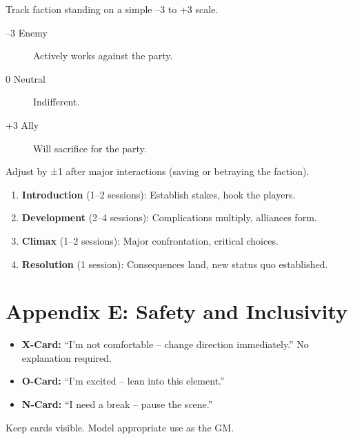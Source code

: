 \begin{tcolorbox}[title=Faction Loyalty Scale (Optional), colback=white!97!gray, colframe=black!80!gray,breakable]
Track faction standing on a simple --3 to +3 scale.
\begin{description}
  \item[--3 Enemy] Actively works against the party.
  \item[0 Neutral] Indifferent.
  \item[+3 Ally] Will sacrifice for the party.
\end{description}
Adjust by ±1 after major interactions (saving or betraying the faction).
\end{tcolorbox}

\begin{tcolorbox}[title=Campaign Pacing (Arc Structure), colback=white!97!gray, colframe=black!80!gray,breakable]
\begin{enumerate}
  \item \textbf{Introduction} (1--2 sessions): Establish stakes, hook the players.
  \item \textbf{Development} (2--4 sessions): Complications multiply, alliances form.
  \item \textbf{Climax} (1--2 sessions): Major confrontation, critical choices.
  \item \textbf{Resolution} (1 session): Consequences land, new status quo established.
\end{enumerate}
\end{tcolorbox}

\clearpage
\section*{Appendix E: Safety and Inclusivity}
\label{app:safety}

\begin{tcolorbox}[title=X-Card System, colback=white!97!gray, colframe=black!80!gray,breakable]
\begin{itemize}
  \item \textbf{X-Card:} ``I'm not comfortable -- change direction immediately.'' No explanation required.
  \item \textbf{O-Card:} ``I'm excited -- lean into this element.''
  \item \textbf{N-Card:} ``I need a break -- pause the scene.''
\end{itemize}
Keep cards visible. Model appropriate use as the GM.
\end{tcolorbox}

